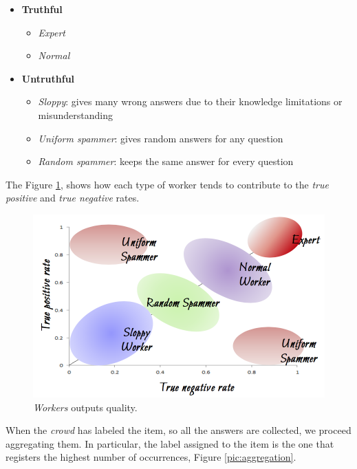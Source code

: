 \clearpage 

\begin{itemize}
\item \textbf{Truthful}
\begin{itemize}
\item \emph{Expert}
\item \emph{Normal}
\end{itemize}
\item \textbf{Untruthful}
\begin{itemize}
\item \emph{Sloppy}: gives many wrong answers due to their knowledge limitations or misunderstanding
\item \emph{Uniform spammer}: gives random answers for any question
\item \emph{Random spammer}: keeps the same answer for every question
\end{itemize}
\end{itemize}

The Figure \ref{pic:worker_crowdsourcing}, shows how each type of worker tends to contribute to the \emph{true positive} and \emph{true negative}  rates.

\begin{figure}[H]%
 \centering
 \includegraphics[width=13cm]{./img/08/worker_crowdsourcing}
 \caption{\label{pic:worker_crowdsourcing} \emph{Workers} outputs quality.}
\end{figure}

When the \emph{crowd} has labeled the item, so all the answers are collected, we proceed aggregating them. In particular, the label assigned to the item is the one that registers the highest number of occurrences, Figure \ref{pic:aggregation}.

